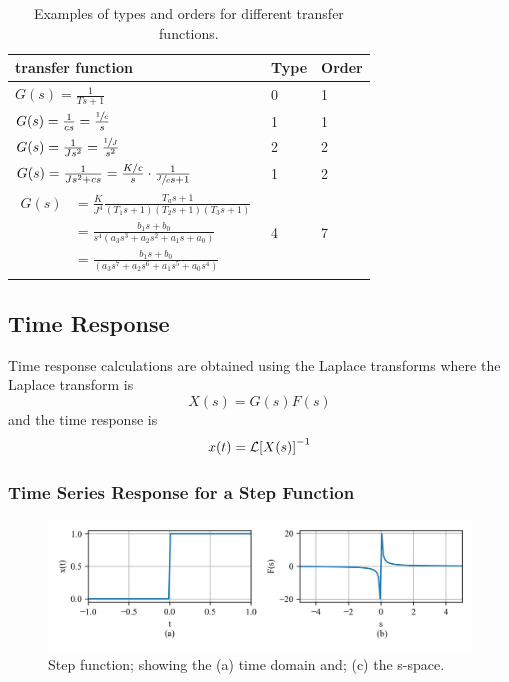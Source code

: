 \documentclass[12pt,letter]{article}
\begin{document}
\begin{table}[H]
\centering
\label{table:types_and_orders}
\caption{Examples of types and orders for different transfer functions.}
\begin{tabular}{@{}lll@{}}
\toprule
transfer function & Type & Order \\ \midrule
 $G(s) = \frac{1}{Ts+1}$& 0 & 1 \\
 $G(s) = \frac{1}{cs} =    \frac{\sfrac{1}{c}}{s} $  & 1 & 1 \\
  $G(s) = \frac{1}{Js^2} = \frac{\sfrac{1}{J}}{s^2}$ & 2 & 2 \\
 $G(s) = \frac{1}{Js^2 + cs} = \frac{K/c}{s} \cdot \frac{1}{\sfrac{J}{c}s+1}$ & 1 & 2 \\
 \parbox{3cm}{\begin{align}
    G(s) &= \frac{K}{J^4} \frac{T_a s + 1}{(T_1s+1)(T_2s+1)(T_3s+1)} \nonumber \\
     &= \frac{b_1 s + b_0}{s^4 (a_3 s^3 + a_2 s^2 + a_1 s + a_0) } \nonumber \\
 	&= \frac{b_1 s + b_0}{(a_3 s^7 + a_2 s^6 + a_1 s^5 + a_0s^4) } \nonumber
  \end{align}}& 4 & 7 \\ \bottomrule
\end{tabular}
\end{table}
\subsection{Time Response}


Time response calculations are obtained using the Laplace transforms where the Laplace transform is
\begin{equation}
X(s) = G(s)F(s)
\end{equation}
and the time response is 
\begin{equation}
x(t) = \mathcal{L}{\left[X(s)\right]}^{-1}
\end{equation}

\subsubsection{Time Series Response for a Step Function}

		\begin{figure}[H]
			\centering
			\includegraphics[width=6.5in]{../figures/T_and_S_space_step_function}
			\caption{Step function; showing the (a) time domain and; (c) the s-space.}
			\label{fig:T_and_S_space_step_function}
		\end{figure}
\end{document}
